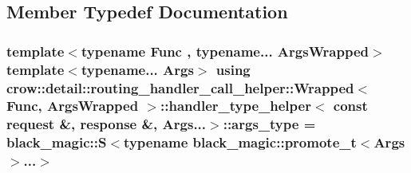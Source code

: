 \subsection{Member Typedef Documentation}
\hypertarget{structcrow_1_1detail_1_1routing__handler__call__helper_1_1_wrapped_1_1handler__type__helper_3_01506e35faa94646c63b5476ce8ce1df0a_aaa4436441afecb2e2637323f9feb57d6}{
\subsubsection[{args\-\_\-type}]{\setlength{\rightskip}{0pt plus 5cm}template$<$typename Func , typename... Args\-Wrapped$>$ template$<$typename... Args$>$ using {\bf crow\-::detail\-::routing\-\_\-handler\-\_\-call\-\_\-helper\-::\-Wrapped}$<$ Func, Args\-Wrapped $>$\-::{\bf handler\-\_\-type\-\_\-helper}$<$ const {\bf request} \&, {\bf response} \&, Args...$>$\-::{\bf args\-\_\-type} =  {\bf black\-\_\-magic\-::\-S}$<$typename {\bf black\-\_\-magic\-::promote\-\_\-t}$<$Args$>$...$>$}}\label{structcrow_1_1detail_1_1routing__handler__call__helper_1_1_wrapped_1_1handler__type__helper_3_01506e35faa94646c63b5476ce8ce1df0a_aaa4436441afecb2e2637323f9feb57d6}
